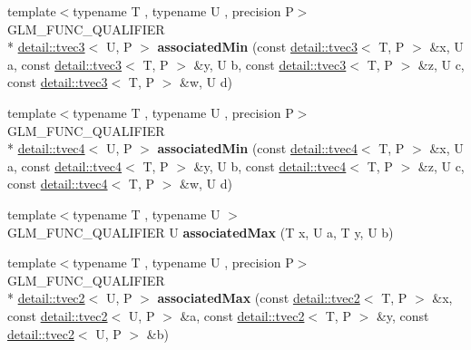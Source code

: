 \begin{DoxyCompactItemize}
\item 
\hypertarget{namespaceglm_ab3c49e83b34be39dffcdd3bcffb69d6a}{{\footnotesize template$<$typename T , typename U , precision P$>$ }\\G\-L\-M\-\_\-\-F\-U\-N\-C\-\_\-\-Q\-U\-A\-L\-I\-F\-I\-E\-R \\*
\hyperlink{structglm_1_1detail_1_1tvec3}{detail\-::tvec3}$<$ U, P $>$ {\bfseries associated\-Min} (const \hyperlink{structglm_1_1detail_1_1tvec3}{detail\-::tvec3}$<$ T, P $>$ \&x, U a, const \hyperlink{structglm_1_1detail_1_1tvec3}{detail\-::tvec3}$<$ T, P $>$ \&y, U b, const \hyperlink{structglm_1_1detail_1_1tvec3}{detail\-::tvec3}$<$ T, P $>$ \&z, U c, const \hyperlink{structglm_1_1detail_1_1tvec3}{detail\-::tvec3}$<$ T, P $>$ \&w, U d)}\label{namespaceglm_ab3c49e83b34be39dffcdd3bcffb69d6a}

\item 
\hypertarget{namespaceglm_a7a99e340d512bb7a18974ee56f22132e}{{\footnotesize template$<$typename T , typename U , precision P$>$ }\\G\-L\-M\-\_\-\-F\-U\-N\-C\-\_\-\-Q\-U\-A\-L\-I\-F\-I\-E\-R \\*
\hyperlink{structglm_1_1detail_1_1tvec4}{detail\-::tvec4}$<$ U, P $>$ {\bfseries associated\-Min} (const \hyperlink{structglm_1_1detail_1_1tvec4}{detail\-::tvec4}$<$ T, P $>$ \&x, U a, const \hyperlink{structglm_1_1detail_1_1tvec4}{detail\-::tvec4}$<$ T, P $>$ \&y, U b, const \hyperlink{structglm_1_1detail_1_1tvec4}{detail\-::tvec4}$<$ T, P $>$ \&z, U c, const \hyperlink{structglm_1_1detail_1_1tvec4}{detail\-::tvec4}$<$ T, P $>$ \&w, U d)}\label{namespaceglm_a7a99e340d512bb7a18974ee56f22132e}

\item 
\hypertarget{namespaceglm_a7700c12d5017a774d6970691147843ba}{{\footnotesize template$<$typename T , typename U $>$ }\\G\-L\-M\-\_\-\-F\-U\-N\-C\-\_\-\-Q\-U\-A\-L\-I\-F\-I\-E\-R U {\bfseries associated\-Max} (T x, U a, T y, U b)}\label{namespaceglm_a7700c12d5017a774d6970691147843ba}

\item 
\hypertarget{namespaceglm_a0d88182c5f13f53520322787924d21a6}{{\footnotesize template$<$typename T , typename U , precision P$>$ }\\G\-L\-M\-\_\-\-F\-U\-N\-C\-\_\-\-Q\-U\-A\-L\-I\-F\-I\-E\-R \\*
\hyperlink{structglm_1_1detail_1_1tvec2}{detail\-::tvec2}$<$ U, P $>$ {\bfseries associated\-Max} (const \hyperlink{structglm_1_1detail_1_1tvec2}{detail\-::tvec2}$<$ T, P $>$ \&x, const \hyperlink{structglm_1_1detail_1_1tvec2}{detail\-::tvec2}$<$ U, P $>$ \&a, const \hyperlink{structglm_1_1detail_1_1tvec2}{detail\-::tvec2}$<$ T, P $>$ \&y, const \hyperlink{structglm_1_1detail_1_1tvec2}{detail\-::tvec2}$<$ U, P $>$ \&b)}\label{namespaceglm_a0d88182c5f13f53520322787924d21a6}


\end{DoxyCompactItemize}
